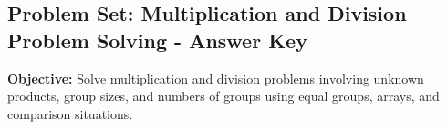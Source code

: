 \documentclass[11pt]{article}
\title{}
\date{}
\begin{document}
\subsection*{Problem Set: Multiplication and Division Problem Solving - Answer Key}
\onehalfspacing

\begin{tcolorbox}[colframe=black!40, colback=gray!5, 
coltitle=black, colbacktitle=black!20, fonttitle=\bfseries\Large, 
title=Learning Objective, halign title=center, left=5pt, right=5pt, top=5pt, bottom=15pt]
\textbf{Objective:} Solve multiplication and division problems involving unknown products, group sizes, and numbers of groups using equal groups, arrays, and comparison situations.
\end{tcolorbox}

\end{document}
